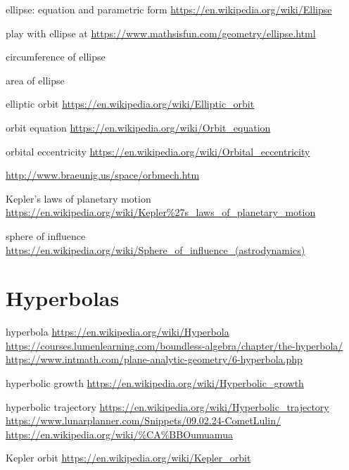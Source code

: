 \documentclass[a4paper,oneside,12pt]{article}
\begin{document}
{\color{red}
\begin{packeditem}
\item ellipse: equation and parametric form
  \url{https://en.wikipedia.org/wiki/Ellipse}

\item play with ellipse at
  \url{https://www.mathsisfun.com/geometry/ellipse.html}

\item circumference of ellipse

\item area of ellipse

\item elliptic orbit
  \url{https://en.wikipedia.org/wiki/Elliptic_orbit}

\item orbit equation
  \url{https://en.wikipedia.org/wiki/Orbit_equation}

\item orbital eccentricity
  \url{https://en.wikipedia.org/wiki/Orbital_eccentricity}

\item \url{http://www.braeunig.us/space/orbmech.htm}

\item Kepler's laws of planetary motion
  \url{https://en.wikipedia.org/wiki/Kepler\%27s_laws_of_planetary_motion}

\item sphere of influence
  \url{https://en.wikipedia.org/wiki/Sphere_of_influence_(astrodynamics)}
\end{packeditem}
}



\section{Hyperbolas}

{\color{red}
\begin{packeditem}
\item hyperbola
  \url{https://en.wikipedia.org/wiki/Hyperbola}
  \url{https://courses.lumenlearning.com/boundless-algebra/chapter/the-hyperbola/}
  \url{https://www.intmath.com/plane-analytic-geometry/6-hyperbola.php}

\item hyperbolic growth
  \url{https://en.wikipedia.org/wiki/Hyperbolic_growth}

\item hyperbolic trajectory
  \url{https://en.wikipedia.org/wiki/Hyperbolic_trajectory}
  \url{https://www.lunarplanner.com/Snippets/09.02.24-CometLulin/}
  \url{https://en.wikipedia.org/wiki/\%CA\%BBOumuamua}

\item Kepler orbit
  \url{https://en.wikipedia.org/wiki/Kepler_orbit}
\end{packeditem}
}
\end{document}
